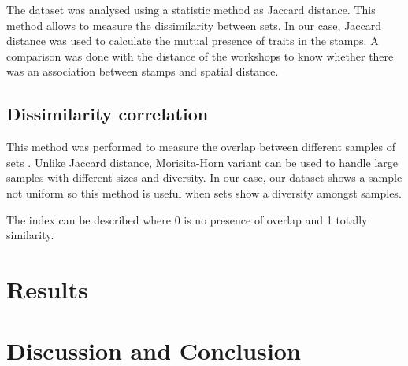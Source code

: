 \documentclass[review]{elsarticle}
\begin{document}
The dataset was analysed using a statistic method as Jaccard distance. This method allows to measure the dissimilarity between sets. In our case, Jaccard distance was used to calculate the mutual presence of traits in the stamps. A comparison was done with the distance of the workshops to know whether there was an association between stamps and spatial distance. 


\subsection{Dissimilarity correlation}


This method was performed to measure the overlap between different samples of sets \citep{horn_measurement_1966}. Unlike Jaccard distance, Morisita-Horn variant can be used to handle large samples with different sizes and diversity. In our case, our dataset shows a sample not uniform so this method is useful when sets show a diversity amongst samples.  

The index can be described  where 0 is no presence of overlap and 1 totally similarity. 

\section{Results}

\section{Discussion and Conclusion}



\end{document}

